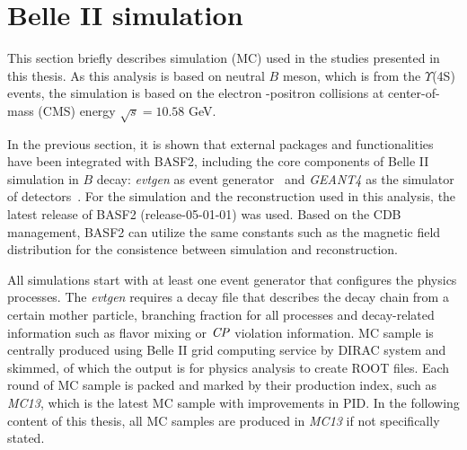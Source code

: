 \begin{comment}
\subsection{Summary}
BASF2 has been developed for an emphasis on providing reliable and high quality performance for Belle II analysis. It satisfies the most of demanding requirements of data taking, simulation, reconstruction, and offline analysis. 
\end{comment}

\section{Belle II simulation}

This section briefly describes simulation (MC) used in the studies presented in this thesis. As this analysis is based on neutral $B$ meson, which is from the $\Upsilon$(4S) events, the  simulation is based on the electron -positron collisions at center-of-mass (CMS) energy $\sqrt{s} = 10.58 $ GeV.

In the previous section, it is shown that external packages and functionalities have been integrated with BASF2, including the core components of Belle II simulation in $B$ decay: \textit{evtgen} as event generator~\cite{evtgen} and \textit{GEANT4} as the simulator of detectors~\cite{agostinelli2003geant4}. For the simulation and the reconstruction used in this analysis, the latest release of BASF2 (release-05-01-01) was used. Based on the CDB management, BASF2 can utilize the same constants such as the magnetic field distribution for the consistence between simulation and reconstruction.

 All simulations start with at least one event generator that configures the physics processes. The \textit{evtgen} requires a decay file that describes the decay chain from a certain mother particle, branching fraction for all processes and decay-related information such as flavor mixing or $\it{CP}$ violation information. MC sample is centrally produced using Belle II grid computing service by DIRAC system and skimmed, of which the output is for physics analysis to create ROOT files. Each round of MC sample is packed and marked by their production index, such as \textit{MC13}, which is the latest MC sample with improvements in PID. In the following content of this thesis, all MC samples are produced in \textit{MC13} if not specifically stated. 
 
